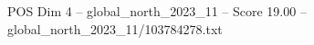 \begin{textsample}{POS Dim 4 – global\_north\_2023\_11 – Score 19.00 – global\_north\_2023\_11/103784278.txt}
\end{textsample}
